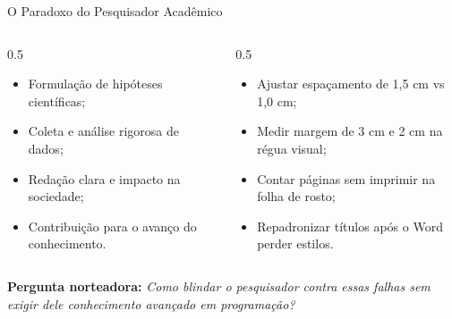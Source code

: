 \documentclass[aspectratio=169, 10pt]{beamer}
\begin{document}
\begin{frame}{O Paradoxo do Pesquisador Acadêmico}
  \begin{columns}[c]
    \begin{column}{0.5\textwidth}
      \begin{tcolorbox}[colback=codebg,colframe=conepeteal,title=\textbf{O Objetivo Central}]
        \begin{itemize}
          \item Formulação de hipóteses científicas;
          \item Coleta e análise rigorosa de dados;
          \item Redação clara e impacto na sociedade;
          \item Contribuição para o avanço do conhecimento.
        \end{itemize}
      \end{tcolorbox}
    \end{column}

    \begin{column}{0.5\textwidth}
      \begin{tcolorbox}[colback=orange!10,colframe=orange!80!black,title=\textbf{A Realidade Operacional}]
        \begin{itemize}
          \item Ajustar espaçamento de 1,5 cm vs 1,0 cm;
          \item Medir margem de 3 cm e 2 cm na régua visual;
          \item Contar páginas sem imprimir na folha de rosto;
          \item Repadronizar títulos após o Word perder estilos.
        \end{itemize}
      \end{tcolorbox}
    \end{column}
  \end{columns}
  \vspace{0.4cm}
  \centering \textbf{Pergunta norteadora:} \textit{Como blindar o pesquisador contra essas falhas sem exigir dele conhecimento avançado em programação?}
\end{frame}
\end{document}
